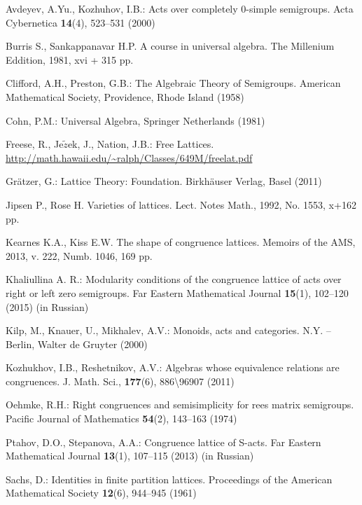 \documentclass{birkau}
\numberwithin{equation}{section}
\theoremstyle{plain}
\theoremstyle{definition}
\begin{document}
	
	
	\begin{thebibliography}{99}

         Avdeyev, A.Yu., Kozhuhov, I.B.:
        Acts over completely 0-simple semigroups.
        Acta Cybernetica \textbf{14}(4), 523--531 (2000)

         Burris S., Sankappanavar H.P. A course in universal algebra. The Millenium Eddition, 1981, xvi + 315 pp.

        Clifford, A.H., Preston, G.B.:
        The Algebraic Theory of Semigroups.
        American  Mathematical  Society,  Providence, Rhode  Island (1958)

        Cohn, P.M.:
        Universal Algebra,
        Springer Netherlands (1981)

        Freese, R., Je$\tilde{z}$ek, J., Nation, J.B.:
        Free Lattices.
        \url{http://math.hawaii.edu/~ralph/Classes/649M/freelat.pdf}

        Gr\"atzer, G.:
        Lattice Theory: Foundation.
        Birkh\"auser Verlag, Basel (2011)

         Jipsen P., Rose H. Varieties of lattices. Lect. Notes Math., 1992, No. 1553, x+162 pp.

         Kearnes K.A., Kiss E.W. The shape of congruence lattices. Memoirs of the AMS, 2013, v. 222, Numb. 1046, 169 pp.

        Khaliullina A. R.:
        Modularity conditions of the congruence lattice of acts over right or left zero semigroups.
        Far Eastern Mathematical Journal \textbf{15}(1), 102--120 (2015) (in Russian)

        Kilp, M., Knauer, U., Mikhalev, A.V.:
        Monoids, acts and categories.
        N.Y. -- Berlin, Walter de Gruyter (2000)

        Kozhukhov, I.B., Reshetnikov, A.V.:
        Algebras whose equivalence relations are congruences.
        J. Math. Sci., \textbf{177}(6), 886\textbackslash96907 (2011)

        Oehmke, R.H.:
        Right congruences and semisimplicity for rees matrix semigroups.
        Pacific Journal of Mathematics \textbf{54}(2), 143--163 (1974)

        Ptahov, D.O., Stepanova, A.A.:
        Congruence lattice of S-acts.
        Far Eastern Mathematical Journal
        \textbf{13}(1), 107--115 (2013) (in Russian)

        Sachs, D.:
        Identities in finite partition lattices.
        Proceedings of the American Mathematical Society
        \textbf{12}(6), 944--945 (1961)
	
	\end{thebibliography}
	
\end{document}
